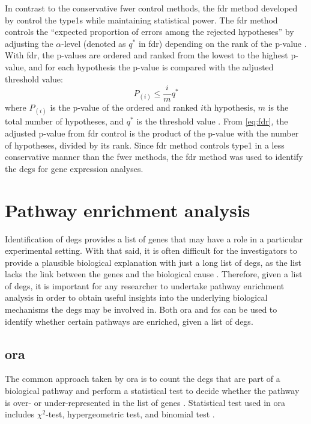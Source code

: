 In contrast to the conservative \gls{fwer} control methods, the \gls{fdr} method developed by \citet{Benjamini1995a} control the \glspl{type1} while maintaining statistical \gls{power}.
The \gls{fdr} method controls the ``expected proportion of errors among the rejected hypotheses'' by adjusting the $\alpha$-level (denoted as $q^*$ in \gls{fdr}) depending on the rank of the p-value \citep{Benjamini1995a}.
With \gls{fdr}, the p-values are ordered and ranked from the lowest to the highest p-value, and for each hypothesis the p-value is compared with the adjusted threshold value:
\begin{equation}
	\label{eq:fdr}
	P_{(i)} \leq \frac{i}{m}q^*
\end{equation}
where $P_{(i)}$ is the p-value of the ordered and ranked $i$th hypothesis, $m$ is the total number of hypotheses, and $q^*$ is the threshold value \citep{Benjamini1995a}.
From \cref{eq:fdr}, the adjusted p-value from \gls{fdr} control is the product of the p-value with the number of hypotheses, divided by its rank.
Since \gls{fdr} method controls \gls{type1} in a less conservative manner than the \gls{fwer} methods, the \gls{fdr} method was used to identify the \glspl{deg} for gene expression analyses.

\section{Pathway enrichment analysis}
\label{sec:pathway_enrichment_analysis}

Identification of \glspl{deg} provides a list of genes that may have a role in a particular experimental setting.
With that said, it is often difficult for the investigators to provide a plausible biological explanation with just a long list of \glspl{deg}, as the list lacks the link between the genes and the biological cause \citep{Khatri2012}.
Therefore, given a list of \glspl{deg}, it is important for any researcher to undertake pathway enrichment analysis in order to obtain useful insights into the underlying biological mechanisms the \glspl{deg} may be involved in.
Both \acrfull{ora} and \acrfull{fcs} can be used to identify whether certain pathways are enriched, given a list of \glspl{deg}.

\subsection{\Gls{ora}}
\label{ssub:ora}

The common approach taken by \gls{ora} is to count the \glspl{deg} that are part of a biological pathway and perform a statistical test to decide whether the pathway is over- or under-represented in the list of genes \citep{Khatri2012}.
Statistical test used in \gls{ora} includes $\chi^2$-test, hypergeometric test, and binomial test \citep{Khatri2012}.

